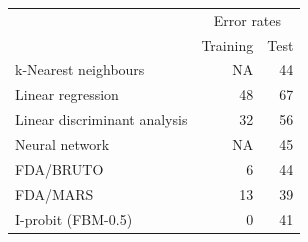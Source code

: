 \documentclass{article}\usepackage[]{graphicx}\usepackage[]{color}
\begin{document}
\begin{table}[!h]
\centering
\begin{tabular}{lrr}
\toprule
\multicolumn{1}{c}{ } & \multicolumn{2}{c}{Error rates} \\ \cmidrule(l{2pt}r{2pt}){2-3}
  & Training & Test\\
\midrule
k-Nearest neighbours & NA & 44\\
Linear regression & 48 & 67\\
Linear discriminant analysis & 32 & 56\\
Neural network & NA & 45\\
FDA/BRUTO & 6 & 44\\
\addlinespace
FDA/MARS & 13 & 39\\
I-probit (FBM-0.5) & 0 & 41\\
\bottomrule
\end{tabular}
\end{table}
\end{document}
